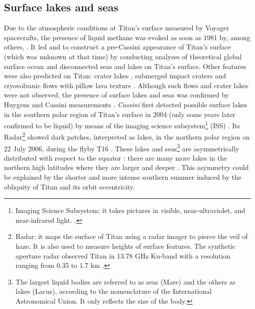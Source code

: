 \subsection{Surface lakes and seas }
\label{sec:intro:liquidBodies}
Due to the atmospheric conditions at Titan's surface measured by Voyager spacecrafts, the presence of liquid methane was evoked as soon as 1981 by, among others, \citet{samuelson1981mean,hanel1981infrared}. It led \citet{sagan1982tide} and \citet{dermott1995tidal} to construct a pre-Cassini appearance of Titan's surface (which was unknown at that time) by conducting analyses of theoretical global surface ocean and disconnected seas and lakes on Titan's surface. Other features were also predicted on Titan: crater lakes \citep{lorenz1994crater}, submerged impact craters \citep{lorenz1997impacts} and cryovolvanic flows with pillow lava texture \citep{lorenz1996pillow}. Although such flows and crater lakes were not observed, the presence of surface lakes and seas was confirmed by Huygens and Cassini measurements \citep{mcewen2005mapping,stofan2007lakes}. \textit{Cassini} first detected possible surface lakes in the southern polar region of Titan's surface in 2004 (only some years later confirmed to be liquid) by means of the imaging science subsystem\footnote{Imaging Science Subsystem: it takes pictures in visible, near-ultraviolet, and near-infrared light. \citep[see][]{porco2004cassini}.} (ISS) \citep{mcewen2005mapping}. Its Radar\footnote{Radar: it maps the surface of Titan using a radar imager to pierce the veil of haze. It is also used to measure heights of surface features. The synthetic aperture radar observed Titan in 13.78 GHz Ku-band with a resolution ranging from 0.35 to 1.7 km \citep[see][]{elachi2004radar}.} showed dark patches, interpreted as lakes, in the northern polar region on 22 July 2006, during the flyby T16 \citep{stofan2007lakes}. These lakes and seas\footnote{The largest liquid bodies are referred to as seas (Mare) and the others as lakes (Lacus), according to the nomenclature of the International Astronomical Union. It only reflects the size of the body.} are asymmetrically distributed with respect to the equator \citep{aharonson2009asymmetric}: there are many more lakes in the northern high latitudes where they are larger and deeper \citep{hayes2008hydrocarbon}. This asymmetry could be explained by the shorter and more intense southern summer induced by the obliquity of Titan and its orbit eccentricity.

